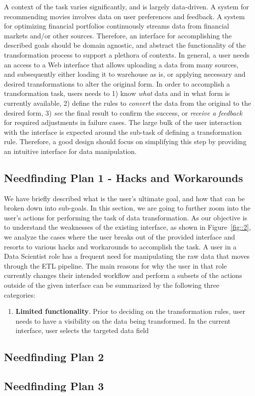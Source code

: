 \documentclass[12pt,letterpaper]{article}
\begin{document}
A context of the task varies significantly, and is largely data-driven. A system for recommending movies involves data on user preferences and feedback. A system for optimizing financial portfolios continuously streams data from financial markets and/or other sources. Therefore, an interface for accomplishing the described goals should be domain agnostic, and abstract the functionality of the transformation process to support a plethora of contexts. In general, a user needs an access to a Web interface that allows uploading a data from many sources, and subsequently either loading it to warehouse as is, or applying necessary and desired transformations to alter the original form. In order to accomplish a transformation task, users needs to 1) know \textit{what} data and in what form is currently available, 2) define the rules to \textit{convert} the data from the original to the desired form, 3) \textit{see} the final result to confirm the success, or \textit{receive a feedback} for required adjustments in failure cases. The large bulk of the user interaction with the interface is expected around the sub-task of defining a transformation rule. Therefore, a good design should focus on simplifying this step by providing an intuitive interface for data manipulation.


\subsection*{Needfinding Plan 1 - Hacks and Workarounds}
We have briefly described what is the user's ultimate goal, and how that can be broken down into sub-goals. In this section, we are going to further zoom into the user's actions for performing the task of data transformation. As our objective is to understand the weaknesses of the existing interface, as shown in Figure~\ref{fig::2}, we analyze the cases where the user breaks out of the provided interface and resorts to various hacks and workarounds to accomplish the task. A user in a Data Scientist role has a frequent need for manipulating the raw data that moves through the ETL pipeline. The main reasons for why the user in that role currently changes their intended workflow and perform a subsets of the actions outside of the given interface can be summarized by the following three categories: 

\begin{enumerate}
    \item \textbf{Limited functionality}. Prior to deciding on the transformation rules, user needs to have a visibility on the data being transformed. In the current interface, user selects the targeted data field
\end{enumerate}

\subsection*{Needfinding Plan 2}
\lipsum[1]

\subsection*{Needfinding Plan 3}
\lipsum[1]


 

\end{document}
